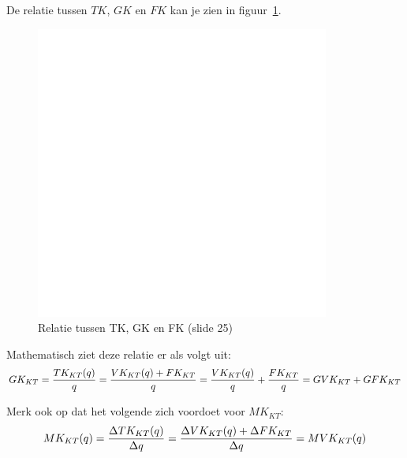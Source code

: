 De relatie tussen $TK$, $GK$ en $FK$ kan je zien in figuur~\ref{fig:relatieTKGKFK}.
\begin{figure}[htbp]
	\centering
	\includegraphics[scale=0.4]{Images/white.png}
	\caption{Relatie tussen TK, GK en FK (slide 25)}
	\label{fig:relatieTKGKFK}
\end{figure}

Mathematisch ziet deze relatie er als volgt uit:
\begin{equation}
	GK_{KT} = \frac{TK_{KT}(q)}{q} \\
		= \frac{VK_{KT}(q) + FK_{KT}}{q} \\
		= \frac{VK_{KT}(q)}{q} + \frac{FK_{KT}}{q} \\
		= GVK_{KT} + GFK_{KT}
\end{equation}

Merk ook op dat het volgende zich voordoet voor $MK_{KT}$:
\begin{equation}
	MK_{KT}(q) = \frac{\Delta TK_{KT}(q)}{\Delta q}\\
		=\frac{\Delta VK_{KT}(q) + \Delta FK_{KT}}{\Delta q}\\
		=MVK_{KT}(q)
\end{equation}

